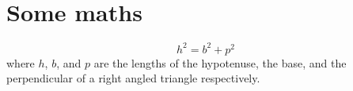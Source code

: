 \section{Some maths}
\begin{equation}
  h^2 = b^2 + p^2
\end{equation}
where \(h\), \(b\), and \(p\) are the lengths of the hypotenuse, the base, and the perpendicular of a right angled triangle respectively.



